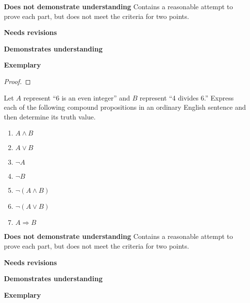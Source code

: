 \documentclass[letterpaper, 11pt]{ximera}
\begin{document}
\begin{writeRubric}
    \item \textbf{Does not demonstrate understanding}
     Contains a reasonable attempt to prove each part, but does not meet the criteria for two points.
    \item \textbf{Needs revisions}
     
    \item \textbf{Demonstrates understanding}
    
    \item \textbf{Exemplary}
        
\end{writeRubric}
                                       
\begin{proof}
\end{proof}

\begin{ex} Let $A$ represent ``6 is an even integer” and $B$ represent ``4 divides 6.” Express each of the following compound propositions in an ordinary English sentence and then determine its truth value.
\begin{enumerate}[label=\alph*.]
	 \item $A\land B$
	 \item $A\lor B$
	 \item $\neg A$
	 \item $\neg B$
	 \item $\neg (A\land B)$
	 \item $\neg(A\lor B)$
	 \item $A\Rightarrow B$
\end{enumerate}
\end{ex}

\begin{writeRubric}
    \item \textbf{Does not demonstrate understanding}
     Contains a reasonable attempt to prove each part, but does not meet the criteria for two points.
    \item \textbf{Needs revisions}
     
    \item \textbf{Demonstrates understanding}
    
    \item \textbf{Exemplary}
        
\end{writeRubric}
                                       
\end{document}
